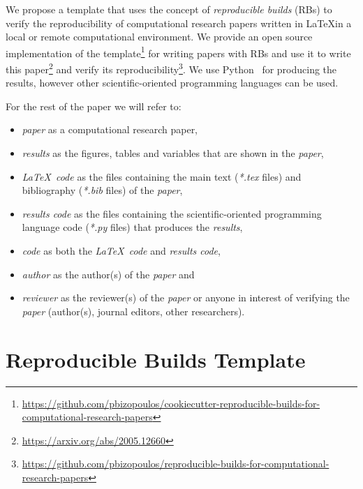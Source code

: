 \documentclass[journal]{IEEEtran}
\begin{document}
We propose a template that uses the concept of \textit{reproducible builds} (RBs) to verify the reproducibility of computational research papers written in \LaTeX in a local or remote computational environment.
We provide an open source implementation of the template\footnote{\url{https://github.com/pbizopoulos/cookiecutter-reproducible-builds-for-computational-research-papers}} for writing papers with RBs and use it to write this paper\footnote{\url{https://arxiv.org/abs/2005.12660}} and verify its reproducibility\footnote{\url{https://github.com/pbizopoulos/reproducible-builds-for-computational-research-papers}}.
We use Python~\cite{van2007python} for producing the results, however other scientific-oriented programming languages can be used.

For the rest of the paper we will refer to:
\begin{itemize}
	\item \textit{paper} as a computational research paper,
	\item \textit{results} as the figures, tables and variables that are shown in the \textit{paper},
	\item \textit{\LaTeX\ code} as the files containing the main text (\textit{*.tex} files) and bibliography (\textit{*.bib} files) of the \textit{paper},
	\item \textit{results code} as the files containing the scientific-oriented programming language code (\textit{*.py} files) that produces the \textit{results},
	\item \textit{code} as both the \textit{\LaTeX\ code} and \textit{results code},
	\item \textit{author} as the author(s) of the \textit{paper} and
	\item \textit{reviewer} as the reviewer(s) of the \textit{paper} or anyone in interest of verifying the \textit{paper} (author(s), journal editors, other researchers).
\end{itemize}

\section{Reproducible Builds Template}
\end{document}
